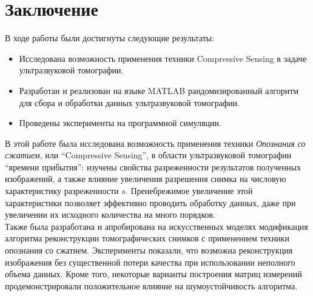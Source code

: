 \documentclass[14pt]{matmex-diploma-custom}
\begin{document}
\section{Заключение} \label{sec:concluding}
В ходе работы были достигнуты следующие результаты:
\begin{itemize}
  \item Исследована возможность применения техники Compres\-sive Sen\-sing в задаче ультразвуковой томографии.
  \item Разработан и реализован на языке MATLAB рандомизированный алгоритм для сбора и обработки данных ультразвуковой томографии.
  \item Проведены эксперименты на программной симуляции.
\end{itemize}
В этой работе была исследована возможность применения техники \textit{Опознания со сжатием}, или ``Compressive Sensing'', в области ультразвуковой томографии ``времени прибытия'': изучены свойства разреженности результатов полученных изображений, а также влияние увеличения разрешения снимка на числовую характеристику разреженности $s$. Пренебрежимое увеличение этой характеристики позволяет эффективно проводить обработку данных, даже при увеличении их исходного количества на много порядков. \\
Также была разработана и апробирована на искусственных моделях модификация алгоритма реконструкции томографических снимков с применением техники опознания со сжатием. Эксперименты показали, что возможна реконструкция изображения без существенной потери качества при использовании неполного объема данных. Кроме того, некоторые варианты построения матриц измерений продемонстрировали положительное влияние на шумоустойчивость алгоритма.





\setmonofont[Mapping=tex-text]{CMU Typewriter Text}


\end{document}
